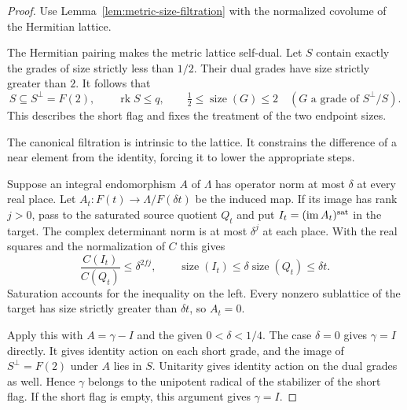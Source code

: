 \begin{proof}
Use Lemma~\ref{lem:metric-size-filtration} with the normalized
covolume of the Hermitian lattice.

The Hermitian pairing makes the metric lattice self-dual.
Let \(S\) contain exactly the grades of size strictly less than \(1/2\).
Their dual grades have size strictly greater than \(2\). It follows that
\[
 S\subseteq S^\perp=F(2),\qquad \operatorname{rk}S\le q,\qquad
 \tfrac12\le\operatorname{size}(G)\le2
 \quad(G\text{ a grade of }S^\perp/S).
\] This describes the short flag and
fixes the treatment of the two endpoint sizes.

\begin{construction}
\caption{The short filtration of Lemma~\ref{lem:canonical-short-flag}. Both boundary sizes belong to the middle quotient. The two outer groups of grades are dual.}\label{fig:short-reciprocal-grades}
\end{construction}


The canonical filtration is intrinsic to the lattice. It constrains the difference of a near element from the identity, forcing it to lower the appropriate steps.


Suppose an integral endomorphism \(A\) of \(\Lambda\) has
operator norm at most \(\delta\) at every real place.
Let \(A_t:F(t)\to\Lambda/F(\delta t)\) be the induced map.
If its image has rank \(j>0\), pass to the saturated source
quotient \(Q_t\) and put \(I_t=(\operatorname{im}A_t)^{\rm sat}\)
in the target. The complex determinant norm is at most
\(\delta^j\) at each place. With the real squares and the
normalization of \(C\) this gives
\[
 \frac{C(I_t)}{C(Q_t)}\le\delta^{2fj},\qquad
 \operatorname{size}(I_t)\le
            \delta\operatorname{size}(Q_t)\le\delta t .
\]
Saturation accounts for the inequality on the left.
Every nonzero sublattice of the target has size strictly greater
than \(\delta t\), so \(A_t=0\).

Apply this with \(A=\gamma-I\) and the given \(0<\delta<1/4\).
The case \(\delta=0\) gives \(\gamma=I\) directly. It gives identity action
on each short grade, and the image of \(S^\perp=F(2)\)
under \(A\) lies in \(S\). Unitarity gives identity action
on the dual grades as well. Hence \(\gamma\) belongs to the
unipotent radical of the stabilizer of the short flag. If
the short flag is empty, this argument gives \(\gamma=I\).

\end{proof}

